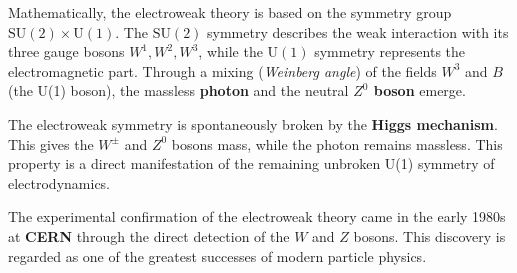 Mathematically, the electroweak theory is based on the symmetry group \(\mathrm{SU(2)} \times \mathrm{U(1)}\).  
The \(\mathrm{SU(2)}\) symmetry describes the weak interaction with its three gauge bosons \(W^1, W^2, W^3\), while the \(\mathrm{U(1)}\) symmetry represents the electromagnetic part.  
Through a mixing (\emph{Weinberg angle}) of the fields \(W^3\) and \(B\) (the U(1) boson), the massless \textbf{photon} and the neutral \textbf{\(Z^0\) boson} emerge.

The electroweak symmetry is spontaneously broken by the \textbf{Higgs mechanism}.  
This gives the \(W^\pm\) and \(Z^0\) bosons mass, while the photon remains massless.  
This property is a direct manifestation of the remaining unbroken U(1) symmetry of electrodynamics.

The experimental confirmation of the electroweak theory came in the early 1980s at \textbf{CERN} through the direct detection of the \(W\) and \(Z\) bosons.  
This discovery is regarded as one of the greatest successes of modern particle physics.

